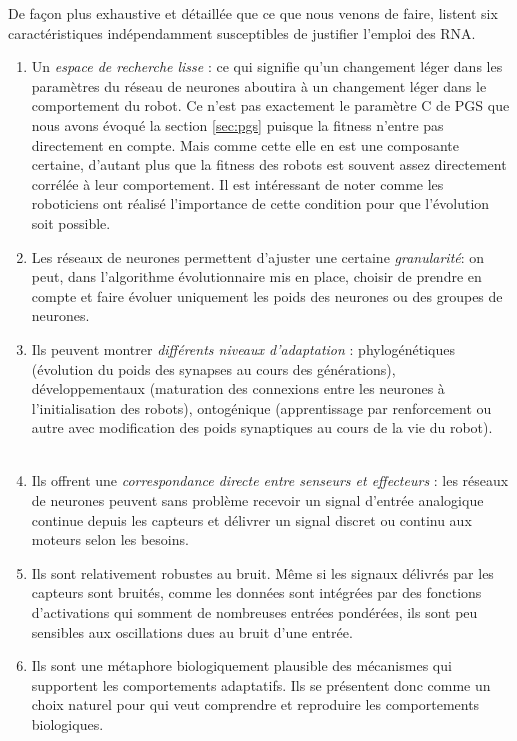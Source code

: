De façon plus exhaustive et détaillée que ce que nous venons de faire, \citet[p. 39]{nolfi00evolrobobiolintetechselfmach} listent six caractéristiques indépendamment susceptibles de justifier l'emploi des RNA.
\begin{enumerate}
   \item Un \emph{espace de recherche lisse} : ce qui signifie qu'un changement léger dans les paramètres du réseau de neurones aboutira à un changement léger dans le comportement du robot. Ce n'est pas exactement le paramètre C de PGS que nous avons évoqué la section \ref{sec:pgs} puisque la fitness n'entre pas directement en compte. Mais comme cette elle en est une composante certaine, d'autant plus que la fitness des robots est souvent assez directement corrélée à leur comportement. Il est intéressant de noter comme les roboticiens ont réalisé l'importance de cette condition pour que l'évolution soit possible.
   \item Les réseaux de neurones permettent d'ajuster une certaine \emph{granularité}: on peut, dans l'algorithme évolutionnaire mis en place, choisir de prendre en compte et faire évoluer uniquement les poids des neurones ou des groupes de neurones.
   \item Ils peuvent montrer \emph{différents niveaux d'adaptation} : phylogénétiques (évolution du poids des synapses au cours des générations), développementaux (maturation des connexions entre les neurones à l'initialisation des robots), ontogénique (apprentissage par renforcement ou autre avec modification des poids synaptiques au cours de la vie du robot).
   \item Ils offrent une \emph{correspondance directe entre senseurs et effecteurs} : les réseaux de neurones peuvent sans problème recevoir un signal d'entrée analogique continue depuis les capteurs et délivrer un signal discret ou continu aux moteurs selon les besoins.
   \item Ils sont relativement robustes au bruit. Même si les signaux délivrés par les capteurs sont bruités, comme les données sont intégrées par des fonctions d'activations qui somment de nombreuses entrées pondérées, ils sont peu sensibles aux oscillations dues au bruit d'une entrée.
   \item Ils sont une métaphore biologiquement plausible des mécanismes qui supportent les comportements adaptatifs. Ils se présentent donc comme un choix naturel pour qui veut comprendre et reproduire les comportements biologiques. \\
       \citep[Plus ou moins librement adapté de ][p. 39 les emphases ont toutes été ajoutées]{nolfi00evolrobobiolintetechselfmach}
\end{enumerate}
